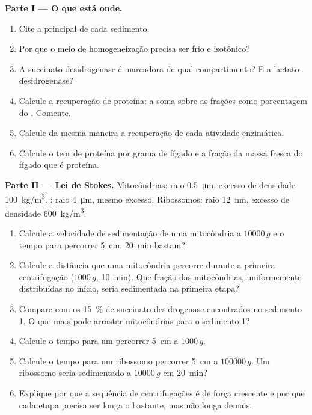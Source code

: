 \begin{problem}
\medskip
\noindent\textbf{Parte I --- O que está onde.}
\begin{enumerate}
  \item Cite a  principal de cada sedimento.
  \item Por que o meio de homogeneização precisa ser frio e isotônico?
  \item A succinato-desidrogenase é marcadora de qual compartimento? E a
        lactato-desidrogenase?
  \item Calcule a recuperação de proteína: a soma sobre as frações como
        porcentagem do . Comente.
  \item Calcule da mesma maneira a recuperação de cada atividade
        enzimática.
  \item Calcule o teor de proteína por grama de fígado e a fração da
        massa fresca do fígado que é proteína.
\end{enumerate}

\medskip
\noindent\textbf{Parte II --- Lei de Stokes.}
Mitocôndrias: raio \qty{0.5}{\micro m}, excesso de densidade
\qty{100}{kg/m^3}. : raio \qty{4}{\micro m}, mesmo excesso.
Ribossomos: raio \qty{12}{nm}, excesso de densidade \qty{600}{kg/m^3}.
\begin{enumerate}[resume]
  \item Calcule a velocidade de sedimentação de uma mitocôndria a
        $\num{10000}\,g$ e o tempo para percorrer \qty{5}{cm}.
        \qty{20}{min} bastam?
  \item Calcule a distância que uma mitocôndria percorre durante a
        primeira centrifugação ($1000\,g$, \qty{10}{min}). Que fração
        das mitocôndrias, uniformemente distribuídas no início, seria
        sedimentada na primeira etapa?
  \item Compare com os \qty{15}{\%} de succinato-desidrogenase
        encontrados no sedimento 1. O que mais pode arrastar
        mitocôndrias para o sedimento 1?
  \item Calcule o tempo para um  percorrer \qty{5}{cm} a
        $1000\,g$.
  \item Calcule o tempo para um ribossomo percorrer \qty{5}{cm} a
        $\num{100000}\,g$. Um ribossomo seria sedimentado a
        $\num{10000}\,g$ em \qty{20}{min}?
  \item Explique por que a sequência de centrifugações é de força
        crescente e por que cada etapa precisa ser longa o bastante, mas
        não longa demais.
\end{enumerate}


\end{problem}
